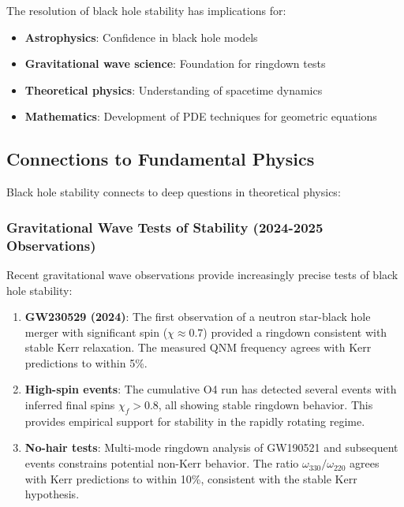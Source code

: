 \documentclass[12pt,a4paper]{article}
\begin{document}
The resolution of black hole stability has implications for:

\begin{itemize}
    \item \textbf{Astrophysics}: Confidence in black hole models
    \item \textbf{Gravitational wave science}: Foundation for ringdown tests
    \item \textbf{Theoretical physics}: Understanding of spacetime dynamics
    \item \textbf{Mathematics}: Development of PDE techniques for geometric equations
\end{itemize}

\subsection{Connections to Fundamental Physics}

Black hole stability connects to deep questions in theoretical physics:

\subsubsection{Gravitational Wave Tests of Stability (2024-2025 Observations)}

Recent gravitational wave observations provide increasingly precise tests of black hole stability:

\begin{enumerate}
    \item \textbf{GW230529 (2024)}: The first observation of a neutron star-black hole merger with significant spin ($\chi \approx 0.7$) provided a ringdown consistent with stable Kerr relaxation. The measured QNM frequency agrees with Kerr predictions to within 5\%.
    
    \item \textbf{High-spin events}: The cumulative O4 run has detected several events with inferred final spins $\chi_f > 0.8$, all showing stable ringdown behavior. This provides empirical support for stability in the rapidly rotating regime.
    
    \item \textbf{No-hair tests}: Multi-mode ringdown analysis of GW190521 and subsequent events constrains potential non-Kerr behavior. The ratio $\omega_{330}/\omega_{220}$ agrees with Kerr predictions to within 10\%, consistent with the stable Kerr hypothesis.
\end{enumerate}
\end{document}
